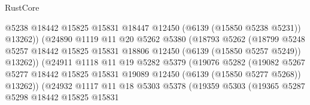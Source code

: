 \begin{lexlean}{RustCore}
\begin{coremodule}
                                    @5238
                                    @18442
                                    @15825
                                    @15831
                                    @18447
                                    @12450
                                    (@6139 (@15850 @5238 @5231))
                                    @13262))
                                (@24890
                                  @1119
                                  @11
                                  @20
                                  @5262
                                  @5380
                                  (@18793
                                    @5262
                                    (@18799
                                      @5248
                                      @5257
                                      @18442
                                      @15825
                                      @15831
                                      @18806
                                      @12450
                                      (@6139 (@15850 @5257 @5249))
                                      @13262))
                                  (@24911
                                    @1118
                                    @11
                                    @19
                                    @5282
                                    @5379
                                    (@19076
                                      @5282
                                      (@19082
                                        @5267
                                        @5277
                                        @18442
                                        @15825
                                        @15831
                                        @19089
                                        @12450
                                        (@6139 (@15850 @5277 @5268))
                                        @13262))
                                    (@24932
                                      @1117
                                      @11
                                      @18
                                      @5303
                                      @5378
                                      (@19359
                                        @5303
                                        (@19365
                                          @5287
                                          @5298
                                          @18442
                                          @15825
                                          @15831

\end{coremodule}
\end{lexlean}
